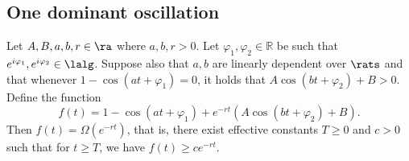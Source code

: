 \subsection{One dominant oscillation}\label{sec:oneOsc}



\begin{lemma}\label{lem: taylor}
Let $A, B, a, b, r \in \ra$ where $a, b, r > 0$. Let
$\varphi_1,\varphi_2\in\mathbb{R}$ be such that 
$e^{i\varphi_1}, e^{i\varphi_2}\in\lalg$. Suppose
also that $a, b$ are linearly dependent over $\rats$ and that
whenever $1-\cos(at + \varphi_1) = 0$, it holds that 
$A\cos(bt + \varphi_2) + B > 0$. Define the function
\[ f(t) = 1-\cos(at + \varphi_1) + e^{-rt}(A\cos(bt + \varphi_2) + B). \]
Then $f(t) = \Omega(e^{-rt})$, that is, there exist effective constants
$T\geq 0$ and $c > 0$ such that for $t \geq T$, we have $f(t)\geq ce^{-rt}$.
\end{lemma}
